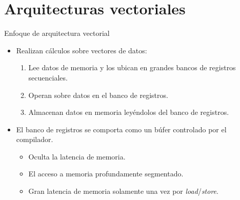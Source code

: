 \section{Arquitecturas vectoriales}

\begin{frame}[t]{Enfoque de arquitectura vectorial}
\begin{itemize}
  \item Realizan cálculos sobre vectores de datos:
    \begin{enumerate}
      \item Lee datos de memoria y los ubican en grandes bancos de registros secuenciales.
      \item Operan sobre datos en el banco de registros.
      \item Almacenan datos en memoria leyéndolos del banco de registros.
    \end{enumerate}

  \item El banco de registros se comporta como un búfer controlado por el compilador.
    \begin{itemize}
      \item Oculta la latencia de memoria.
      \item El acceso a memoria profundamente segmentado.
      \item Gran latencia de memoria solamente una vez por \emph{load}/\emph{store}.
    \end{itemize}
\end{itemize}
\end{frame}

